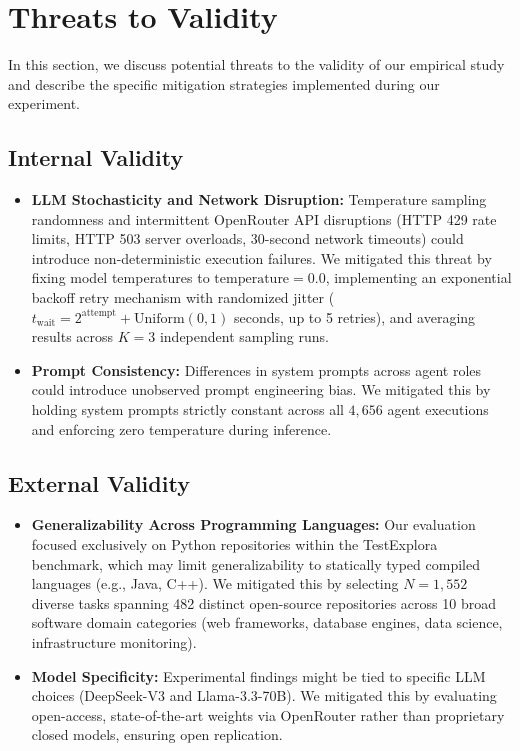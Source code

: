 \documentclass[conference]{IEEEtran}
\begin{document}
\section{Threats to Validity}
\label{sec:threats}

In this section, we discuss potential threats to the validity of our empirical study and describe the specific mitigation strategies implemented during our experiment.

\subsection{Internal Validity}
\begin{itemize}
    \item \textbf{LLM Stochasticity and Network Disruption:} Temperature sampling randomness and intermittent OpenRouter API disruptions (HTTP 429 rate limits, HTTP 503 server overloads, 30-second network timeouts) could introduce non-deterministic execution failures. We mitigated this threat by fixing model temperatures to $\text{temperature}=0.0$, implementing an exponential backoff retry mechanism with randomized jitter ($t_{\text{wait}} = 2^{\text{attempt}} + \text{Uniform}(0, 1)$ seconds, up to 5 retries), and averaging results across $K=3$ independent sampling runs.
    \item \textbf{Prompt Consistency:} Differences in system prompts across agent roles could introduce unobserved prompt engineering bias. We mitigated this by holding system prompts strictly constant across all $4,656$ agent executions and enforcing zero temperature during inference.
\end{itemize}

\subsection{External Validity}
\begin{itemize}
    \item \textbf{Generalizability Across Programming Languages:} Our evaluation focused exclusively on Python repositories within the TestExplora benchmark, which may limit generalizability to statically typed compiled languages (e.g., Java, C++). We mitigated this by selecting $N=1,552$ diverse tasks spanning 482 distinct open-source repositories across 10 broad software domain categories (web frameworks, database engines, data science, infrastructure monitoring).
    \item \textbf{Model Specificity:} Experimental findings might be tied to specific LLM choices (DeepSeek-V3 and Llama-3.3-70B). We mitigated this by evaluating open-access, state-of-the-art weights via OpenRouter rather than proprietary closed models, ensuring open replication.
\end{itemize}
\end{document}
